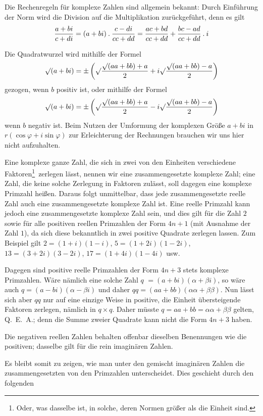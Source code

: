 %
Die Rechenregeln für komplexe Zahlen sind allgemein bekannt: Durch Einführung der Norm wird die Division auf die Multiplikation zurückgeführt, denn es gilt
\[
\frac{a+bi}{c+di}=(a+bi)\mathbin{.}\frac{c-di}{cc+dd}=\frac{ac+bd}{cc+dd}+\frac{bc-ad}{cc+dd}\mathbin{.} i
\]

Die Quadratwurzel wird mithilfe der Formel
\[
\surd(a+bi)=\pm\left(\surd\frac{\surd(aa+bb)+a}{2}+i\surd\frac{\surd(aa+bb)-a}{2}\right)
\]
gezogen, wenn $b$ positiv ist, oder mithilfe der Formel
\[
\surd(a+bi)=\pm\left(\surd\frac{\surd(aa+bb)+a}{2}-i\surd\frac{\surd(aa+bb)-a}{2}\right)
\]
wenn $b$ negativ ist. Beim Nutzen der Umformung der komplexen Größe $a+bi$ in $r(\cos\varphi+i\sin\varphi)$ zur Erleichterung der Rechnungen brauchen wir uns hier nicht aufzuhalten.

Eine komplexe ganze Zahl, die sich in zwei von den Einheiten verschiedene Faktoren\begingroup\renewcommand{\thefootnote}{*)}\footnote{Oder, was dasselbe ist, in solche, deren Normen größer als die Einheit sind.}\endgroup\ zerlegen lässt, nennen wir eine zusammengesetzte komplexe Zahl; eine Zahl, die keine solche Zerlegung in Faktoren zulässt, soll dagegen eine komplexe Primzahl heißen. Daraus folgt unmittelbar, dass jede zusammengesetzte reelle Zahl auch eine zusammengesetzte komplexe Zahl ist. Eine reelle Primzahl kann jedoch eine zusammengesetzte komplexe Zahl sein, und dies gilt für die Zahl $2$ sowie für alle positiven reellen Primzahlen der Form $4n+1$ (mit Ausnahme der Zahl $1$), da sich diese bekanntlich in zwei positive Quadrate zerlegen lassen. Zum Beispiel gilt $2=(1+i)(1-i)$, $5=(1+2i)(1-2i)$, $13=(3+2i)(3-2i)$, $17=(1+4i)(1-4i)$ usw.

Dagegen sind positive reelle Primzahlen der Form $4n+3$ stets komplexe Primzahlen. Wäre nämlich eine solche Zahl $q$ $=(a+bi)(\alpha+\beta i)$, so wäre auch $q=(a-bi)(\alpha-\beta i)$ und daher $qq=(aa+bb)(\alpha\alpha+\beta\beta)$. Nun lässt sich aber $qq$ nur auf eine einzige Weise in positive, die Einheit übersteigende Faktoren zerlegen, nämlich in $q\times q$. Daher müsste $q=aa+bb=\alpha\alpha+\beta\beta$ gelten, \mbox{Q. E. A.}; denn die Summe zweier Quadrate kann nicht die Form $4n+3$ haben.

%
Die negativen reellen Zahlen behalten offenbar dieselben Benennungen wie die positiven; dasselbe gilt für die rein imaginären Zahlen.

Es bleibt somit zu zeigen, wie man unter den gemischt imaginären Zahlen die zusammengesetzten von den Primzahlen unterscheidet. Dies geschieht durch den folgenden

